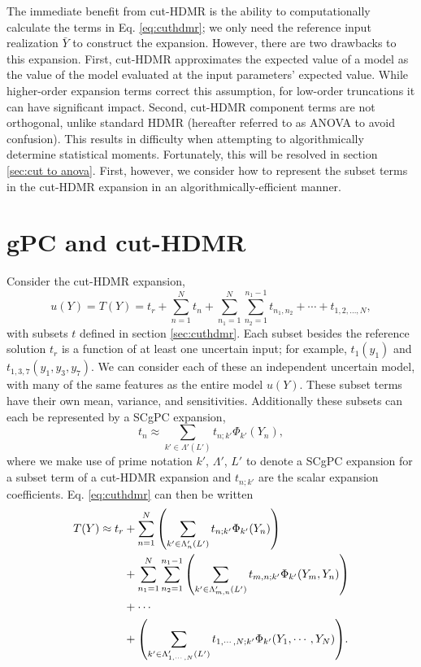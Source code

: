 The immediate benefit from cut-HDMR is the ability to computationally calculate the terms in Eq.
\ref{eq:cuthdmr};
we only need the reference input realization $\bar Y$ to construct the expansion.  However, there are two
drawbacks to this expansion.  First, cut-HDMR approximates the expected value of a model as the value of the
model evaluated at the input parameters' expected value.  While higher-order expansion terms correct this
assumption, for low-order truncations it can have significant impact.
Second,
cut-HDMR component terms are not orthogonal, unlike standard HDMR (hereafter referred to as ANOVA to avoid
confusion).  This results in difficulty
when attempting to algorithmically determine statistical moments.  Fortunately, this will be resolved in
section \ref{sec:cut to anova}.  First, however, we consider how to represent the subset terms in the cut-HDMR
expansion in an algorithmically-efficient manner.

\section{gPC and cut-HDMR}\label{sec:gPC cut}
Consider the cut-HDMR expansion,
\begin{equation}\label{eq:cuthdmr}
  u(Y) = T(Y) = t_r + \sum_{n=1}^N t_n + \sum_{n_1=1}^N \sum_{n_2=1}^{n_1-1}
  t_{n_1,n_2}+\cdots+t_{1,2,\ldots,N},
\end{equation}
with subsets $t$ defined in section \ref{sec:cuthdmr}. Each subset besides the reference solution $t_r$ is a
function of at least one uncertain input; for example, $t_1(y_1)$ and $t_{1,3,7}(y_1,y_3,y_7)$.  We can
consider each of these an independent uncertain model, with many of the same features as the entire model
$u(Y)$.  These subset terms have their own mean, variance, and sensitivities.  Additionally
these subsets can each be represented by a SCgPC expansion,
\begin{equation}
  t_n \approx \sum_{k'\in\Lambda'(L')} t_{n;k'}\Phi_{k'}(Y_n),
\end{equation}
where we make use of prime notation $k'$, $\Lambda'$, $L'$ to denote a SCgPC expansion
for a subset term of a cut-HDMR expansion and $t_{n;k'}$ are the scalar expansion coefficients.  Eq.
\ref{eq:cuthdmr} can then be written
\begin{align}\label{eq:cut and gpc}
  T(Y) \approx t_r &+ \sum_{n=1}^N \qty(\sum_{k'\in\Lambda_n'(L')} t_{n;k'}\Phi_{k'}(Y_n)) \\ \nonumber
  &+ \sum_{n_1=1}^N \sum_{n_2=1}^{n_1-1} \qty(\sum_{k'\in\Lambda_{m,n}'(L')} t_{m,n;k'}\Phi_{k'}(Y_m,Y_n)) \\
  \nonumber &+\cdots \\ \nonumber
  &+ \qty(\sum_{k'\in\Lambda_{1,\cdots,N}'(L')} t_{1,\cdots,N;k'}\Phi_{k'}(Y_1,\cdots,Y_N)).
\end{align}


